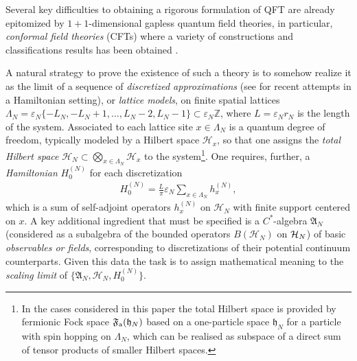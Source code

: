 \documentclass[a4paper, 11pt]{article}
\newcommand{\ua}{\textup a}
\newcommand{\fF}{\mathfrak{F}}\newcommand{\cF}{\mathcal{F}}\newcommand{\dF}{\mathds{F}}\newcommand{\sF}{\mathscr{F}}
\DeclareMathOperator{\1}{\mathds{1}}
\begin{document}
Several key difficulties to obtaining a rigorous formulation of QFT are already epitomized by $1+1$-dimensional gapless quantum field theories, in particular, \emph{conformal field theories} (CFTs) where a variety of constructions and classifications results has been obtained \cite{BelavinInfiniteConformalSymmetry, DiFrancescoCFTBook, EvansQuantumSymmetriesOn, WassermannOperatorAlgebrasAnd, BrunettiModularStructureAnd, GabbianiOperatorAlgebrasAnd, BuchholzTheCurrentAlgebra, KawahigashiClassificationOfLocal, CarpiFromVertexOperator}. 

A natural strategy to prove the existence of such a theory is to somehow realize it as the limit of a sequence of \emph{discretized approximations} (see \cite{JonesSomeUnitaryRepresentations, JonesANoGo, JonesScaleInvariantTransfer, BrothierConstructionsOfConformal, KlieschContinuumLimitsOf, OsborneQuantumFieldsFor} for recent attempts in a Hamiltonian setting), or \emph{lattice models}, on finite spatial lattices $\Lambda_{N} = \varepsilon_{N}\{-L_{N}, -L_{N} +1, \ldots, L_{N}-2, L_{N}-1\}\subset\varepsilon_{N}  \mathbb{Z}$, where $L=\varepsilon_N r_N$ is the length of the system. Associated to each lattice site $x\in \Lambda_N$ is a quantum degree of freedom, typically modeled by a Hilbert space $\mathcal{H}_x$, so that one assigns the \emph{total Hilbert space} $\mathcal{H}_{N} \subset \bigotimes_{x\in \Lambda_{N}} \mathcal{H}_x$ to the system\footnote{In the cases considered in this paper the total Hilbert space is provided by fermionic Fock space $\fF_{\ua}(\mathfrak{h}_{N})$ based on a one-particle space $\mathfrak{h}_{N}$ for a particle with spin hopping on $\Lambda_N$, which can be realised as subspace of a direct sum of tensor products of smaller Hilbert spaces.}. One requires, further, a \emph{Hamiltonian} $H_{0}^{(N)}$ for each discretization
\begin{align*}
H^{(N)}_0 = \tfrac{L}{\pi}\varepsilon_N\sum_{x\in\Lambda_N} h_x^{(N)},
\end{align*}
which is a sum of self-adjoint operators $h_x^{(N)}$ on $\mathcal{H}_N$ with finite support centered on $x$. A key additional ingredient that must be specified is a $C^{*}$-algebra $\mathfrak{A}_N$ (considered as a subalgebra of the bounded operators $B(\mathcal{H}_N)$ on $\mathcal{H}_{N}$) of basic \emph{observables or fields}, corresponding to discretizations of their potential continuum counterparts. Given this data the task is to assign mathematical meaning to the \emph{scaling limit} of $\{\mathfrak{A}_N, \mathcal{H}_N, H^{(N)}_0\}$. 
\end{document}
